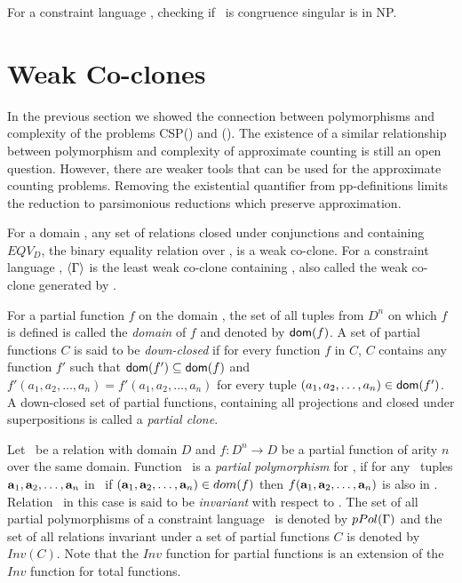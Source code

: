 \begin{theorem} 
For a constraint language \mrelset, checking if \mrelset\ is congruence singular is in NP.
\end{theorem}

\section{Weak Co-clones}
In the previous section we showed the connection between polymorphisms and complexity 
of the problems CSP(\mrelset) and \ccsp(\mrelset)\@. The existence of a similar relationship
between polymorphism and complexity of approximate counting is still an open
question. However, there are weaker tools that can be used for the approximate counting
problems. Removing the existential quantifier from pp-definitions limits the 
reduction to parsimonious reductions which preserve approximation.


For a domain \mD, any set of relations closed under conjunctions and
containing \(EQV_D\), the binary equality relation over \mD,
is a weak co-clone. For a constraint language \mrelset, 
\(\langle \Gamma \rangle\) is the least weak co-clone containing \mrelset,
also called the weak co-clone generated by \mrelset\@.

For a partial function \(f\) on the domain \mD,
the set of all tuples from \(D^n\) on which \(f\) is
defined is called the \emph{domain} of \(f\) and denoted by \({\sf dom}(f)\).
A set of partial functions \(C\) is said to be \emph{down-closed} if
for every function \(f\) in \(C\), \(C\) contains any function \(f'\) such that
\({\sf dom}(f')\subseteq{\sf dom}(f)\) and \(f'(a_1,a_2,\dotsc,a_n)=f'(a_1,a_2,\dotsc,a_n)\)
for every tuple \((a_1,a_2,\dotsc,a_n)\in {\sf dom}(f')\)\@.
A down-closed set of partial functions, 
containing all projections and closed under 
superpositions is called a \emph{partial clone}. 

Let \mR\ be a relation with domain \(D\) and \(f:D^n\to D\) be a partial function of arity \(n\)
over the same domain.
Function \mf\ is a \emph{partial polymorphism} for \mR,
if for any \mn\ tuples \(\textbf{a}_1,\textbf{a}_2,\dotsc,\textbf{a}_n\) in \mR\, 
if  \((\textbf{a}_1,\textbf{a}_2,\dotsc,\textbf{a}_n) \in dom(f)\) then 
\(f(\textbf{a}_1,\textbf{a}_2,\dotsc,\textbf{a}_n)\) is also in \mR\@. Relation \mR\ in this case is said to
be \emph{invariant} with respect to \mf\@.
The set of all partial polymorphisms of a constraint language \mrelset\ is denoted by
\(pPol(\Gamma)\) and the set of all relations invariant under a set of partial functions
\(C\) is denoted by \(Inv(C)\)\@. Note that the \(Inv\) function for partial functions is
an extension of the \(Inv\) function for total functions.


